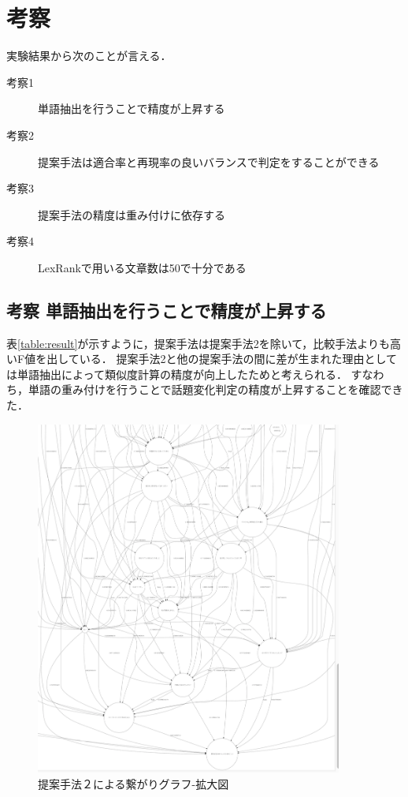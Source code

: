 \section{考察}
\label{exp:consideration}
実験結果から次のことが言える．\\
\begin{description} 
  \item[考察1] 単語抽出を行うことで精度が上昇する
  \item[考察2] 提案手法は適合率と再現率の良いバランスで判定をすることができる
  \item[考察3] 提案手法の精度は重み付けに依存する
  \item[考察4] LexRankで用いる文章数は50で十分である
\end{description}
\subsection*{考察 単語抽出を行うことで精度が上昇する}
表\ref{table:result}が示すように，提案手法は提案手法2を除いて，比較手法よりも高いF値を出している．
提案手法2と他の提案手法の間に差が生まれた理由としては単語抽出によって類似度計算の精度が向上したためと考えられる．
すなわち，単語の重み付けを行うことで話題変化判定の精度が上昇することを確認できた．
\begin{figure}[htbp]
 \begin{center}
  \includegraphics[width=0.9\textwidth]{../images/5.Experiment/Graph=FastText-Plain-cut2.png}
  \caption{提案手法２による繋がりグラフ-拡大図}
  \label{Fig:GraphFT-Plain}
  \vspace{-10pt}
 \end{center}
\end{figure}

